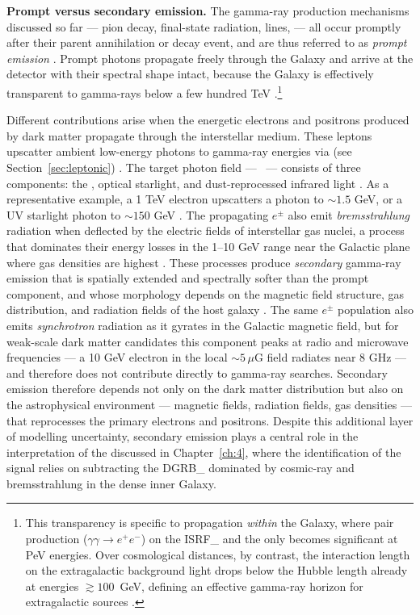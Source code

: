 \textbf{Prompt versus secondary emission.}
The gamma-ray production mechanisms discussed so far --- pion decay, final-state radiation, lines, \VIB --- all occur promptly after their parent annihilation or decay event, and are thus referred to as \textit{prompt emission} \cite{Cirelli:2024ssz,Pinetti:2021jjs}.
Prompt photons propagate freely through the Galaxy and arrive at the detector with their spectral shape intact, because the Galaxy is effectively transparent to gamma-rays below a few hundred TeV \cite{Hooper:2024}.\footnote{This transparency is specific to propagation \emph{within} the Galaxy, where pair production ($\gamma\gamma \to e^+e^-$) on the \gls{ISRF_} and the \CMB only becomes significant at PeV energies. Over cosmological distances, by contrast, the interaction length on the extragalactic background light drops below the Hubble length already at energies $\gtrsim 100$~GeV, defining an effective gamma-ray horizon for extragalactic sources \cite{Hooper:2024}.}

Different contributions arise when the energetic electrons and positrons produced by dark matter propagate through the interstellar medium.
These leptons upscatter ambient low-energy photons to gamma-ray energies via \ICS (see Section~\ref{sec:leptonic}) \cite{Blumenthal:1970gc}.
The target photon field --- \ISRF\ --- consists of three components: the \CMB, optical starlight, and dust-reprocessed infrared light \cite{Strong:2007nh}.
As a representative example, a 1 TeV electron upscatters a \CMB photon to $\sim 1.5$ GeV, or a UV starlight photon to $\sim 150$ GeV \cite{Cirelli:2024ssz}.
The propagating $e^\pm$ also emit \textit{bremsstrahlung} radiation when deflected by the electric fields of interstellar gas nuclei, a process that dominates their energy losses in the 1--10 GeV range near the Galactic plane where gas densities are highest \cite{Blumenthal:1970gc,Dermer:2009zz}.
These processes produce \textit{secondary} gamma-ray emission that is spatially extended and spectrally softer than the prompt component, and whose morphology depends on the magnetic field structure, gas distribution, and radiation fields of the host galaxy \cite{Strong:2007nh}.
The same $e^\pm$ population also emits \textit{synchrotron} radiation as it gyrates in the Galactic magnetic field, but for weak-scale dark matter candidates this component peaks at radio and microwave frequencies --- a 10 GeV electron in the local $\sim 5\,\mu$G field radiates near 8 GHz --- and therefore does not contribute directly to gamma-ray searches.
Secondary emission therefore depends not only on the dark matter distribution but also on the astrophysical environment --- magnetic fields, radiation fields, gas densities --- that reprocesses the primary electrons and positrons.
Despite this additional layer of modelling uncertainty, secondary emission plays a central role in the interpretation of the \GCE discussed in Chapter~\ref{ch:4}, where the identification of the signal relies on subtracting the \gls{DGRB_} dominated by cosmic-ray \ICS and bremsstrahlung in the dense inner Galaxy.

